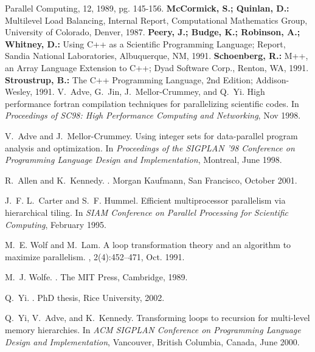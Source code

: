 \begin{thebibliography}{WW}
   Parallel Computing, 12, 1989, pg. 145-156.
   {\bf McCormick, S.; Quinlan, D.:} Multilevel Load Balancing,
   Internal Report, Computational Mathematics Group, University of Colorado,
   Denver, 1987.
   {\bf Peery, J.; Budge, K.; Robinson, A.; Whitney, D.:}
   Using C++ as a Scientific Programming Language; Report,
   Sandia National Laboratories, Albuquerque, NM, 1991.
   {\bf Schoenberg, R.:}
   M++, an Array Language Extension to C++; Dyad Software Corp., Renton,
   WA, 1991.
   {\bf Stroustrup, B.:}
   The C++ Programming Language, 2nd Edition; Addison-Wesley, 1991.
V.~Adve, G.~Jin, J.~Mellor-Crummey, and Q.~Yi.
\newblock High performance fortran compilation techniques for parallelizing
  scientific codes.
\newblock In {\em Proceedings of SC98: High Performance Computing and
  Networking}, Nov 1998.

V.~Adve and J.~Mellor-Crummey.
\newblock Using integer sets for data-parallel program analysis and
  optimization.
\newblock In {\em Proceedings of the {SIGPLAN} '98 Conference on Programming
  Language Design and Implementation}, Montreal, June 1998.

R.~Allen and K.~Kennedy.
.
\newblock Morgan Kaufmann, San Francisco, October 2001.

J.~F. L.~Carter and S.~F. Hummel.
\newblock Efficient multiprocessor parallelism via hierarchical tiling.
\newblock In {\em SIAM Conference on Parallel Processing for Scientific
  Computing}, February 1995.

M.~E. Wolf and M.~Lam.
\newblock A loop transformation theory and an algorithm to maximize
  parallelism.
,
  2(4):452--471, Oct. 1991.

M.~J. Wolfe.
.
\newblock The MIT Press, Cambridge, 1989.

Q.~Yi.
.
\newblock PhD thesis, Rice University, 2002.

Q.~Yi, V.~Adve, and K.~Kennedy.
\newblock Transforming loops to recursion for multi-level memory hierarchies.
\newblock In {\em ACM SIGPLAN Conference on Programming Language Design and
  Implementation}, Vancouver, British Columbia, Canada, June 2000.


\end{thebibliography}
